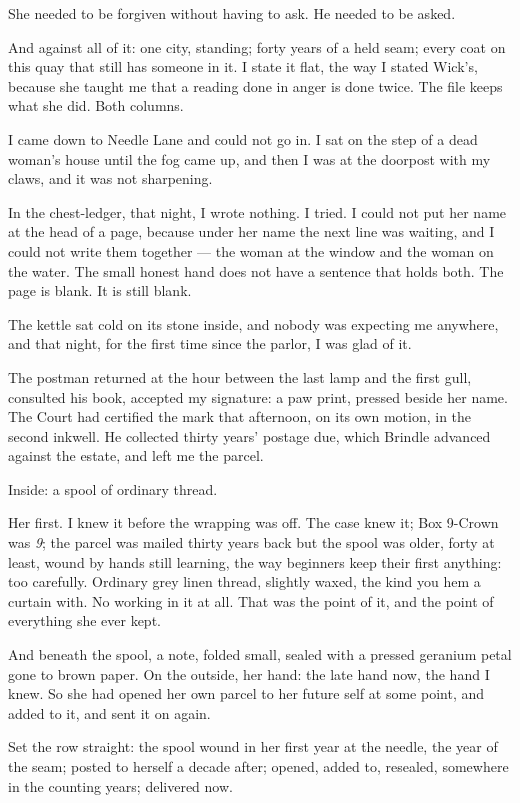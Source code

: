 She needed to be forgiven without having to ask. He needed to be asked.

And against all of it: one city, standing; forty years of a held seam; every coat on this quay that still has someone in it. I state it flat, the way I stated Wick's, because she taught me that a reading done in anger is done twice. The file keeps what she did. Both columns.

I came down to Needle Lane and could not go in. I sat on the step of a dead woman's house until the fog came up, and then I was at the doorpost with my claws, and it was not sharpening.

In the chest-ledger, that night, I wrote nothing. I tried. I could not put her name at the head of a page, because under her name the next line was waiting, and I could not write them together --- the woman at the window and the woman on the water. The small honest hand does not have a sentence that holds both. The page is blank. It is still blank.

The kettle sat cold on its stone inside, and nobody was expecting me anywhere, and that night, for the first time since the parlor, I was glad of it.

\scenebreak

The postman returned at the hour between the last lamp and the first gull, consulted his book, accepted my signature: a paw print, pressed beside her name. The Court had certified the mark that afternoon, on its own motion, in the second inkwell. He collected thirty years' postage due, which Brindle advanced against the estate, and left me the parcel.

Inside: a spool of ordinary thread.

Her first. I knew it before the wrapping was off. The case knew it; Box 9-Crown was \emph{9}; the parcel was mailed thirty years back but the spool was older, forty at least, wound by hands still learning, the way beginners keep their first anything: too carefully. Ordinary grey linen thread, slightly waxed, the kind you hem a curtain with. No working in it at all. That was the point of it, and the point of everything she ever kept.

And beneath the spool, a note, folded small, sealed with a pressed geranium petal gone to brown paper. On the outside, her hand: the late hand now, the hand I knew. So she had opened her own parcel to her future self at some point, and added to it, and sent it on again.

Set the row straight: the spool wound in her first year at the needle, the year of the seam; posted to herself a decade after; opened, added to, resealed, somewhere in the counting years; delivered now.

